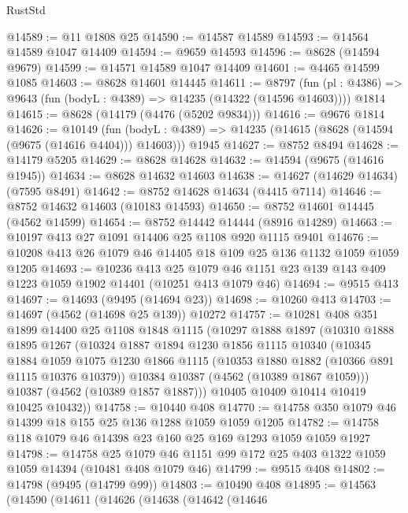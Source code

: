 \begin{lexlean}{RustStd}
\begin{coremodule}
@14589 := @11 @1808 @25
@14590 := @14587 @14589
@14593 := @14564 @14589 @1047 @14409
@14594 := @9659 @14593
@14596 := @8628 (@14594 @9679)
@14599 := @14571 @14589 @1047 @14409
@14601 := @4465 @14599 @1085
@14603 := @8628 @14601 @14445
@14611 := @8797
    (fun (pl : @4386) => @9643 (fun (bodyL : @4389) => @14235 (@14322 (@14596 @14603))))
    @1814
@14615 := @8628 (@14179 (@4476 (@5202 @9834)))
@14616 := @9676 @1814
@14626 := @10149
    (fun (bodyL : @4389) => @14235 (@14615 (@8628 (@14594 (@9675 (@14616 @4404))) @14603)))
    @1945
@14627 := @8752 @8494
@14628 := @14179 @5205
@14629 := @8628 @14628
@14632 := @14594 (@9675 (@14616 @1945))
@14634 := @8628 @14632 @14603
@14638 := @14627 (@14629 @14634) (@7595 @8491)
@14642 := @8752 @14628 @14634 (@4415 @7114)
@14646 := @8752 @14632 @14603 (@10183 @14593)
@14650 := @8752 @14601 @14445 (@4562 @14599)
@14654 := @8752 @14442 @14444 (@8916 @14289)
@14663 := @10197 @413 @27 @1091 @14406 @25 @1108 @920 @1115 @9401
@14676 := @10208 @413 @26 @1079 @46 @14405 @18 @109 @25 @136 @1132 @1059 @1059 @1205
@14693 := @10236
    @413
    @25
    @1079
    @46
    @1151
    @23
    @139
    @143
    @409
    @1223
    @1059
    @1902
    @14401
    (@10251 @413 @1079 @46)
@14694 := @9515 @413
@14697 := @14693 (@9495 (@14694 @23))
@14698 := @10260 @413
@14703 := @14697 (@4562 (@14698 @25 @139)) @10272
@14757 := @10281
    @408
    @351
    @1899
    @14400
    @25
    @1108
    @1848
    @1115
    (@10297
      @1888
      @1897
      (@10310
        @1888
        @1895
        @1267
        (@10324
          @1887
          @1894
          @1230
          @1856
          @1115
          @10340
          (@10345
            @1884
            @1059
            @1075
            @1230
            @1866
            @1115
            (@10353 @1880 @1882 (@10366 @891 @1115 @10376 @10379))
            @10384
            @10387
            (@4562 (@10389 @1867 @1059)))
          @10387
          (@4562 (@10389 @1857 @1887)))
        @10405
        @10409
        @10414
        @10419
        @10425
        @10432))
@14758 := @10440 @408
@14770 := @14758 @350 @1079 @46 @14399 @18 @155 @25 @136 @1288 @1059 @1059 @1205
@14782 := @14758 @118 @1079 @46 @14398 @23 @160 @25 @169 @1293 @1059 @1059 @1927
@14798 := @14758
    @25
    @1079
    @46
    @1151
    @99
    @172
    @25
    @403
    @1322
    @1059
    @1059
    @14394
    (@10481 @408 @1079 @46)
@14799 := @9515 @408
@14802 := @14798 (@9495 (@14799 @99))
@14803 := @10490 @408
@14895 := @14563
    (@14590
      (@14611
        (@14626
          (@14638
            (@14642
              (@14646

\end{coremodule}
\end{lexlean}
